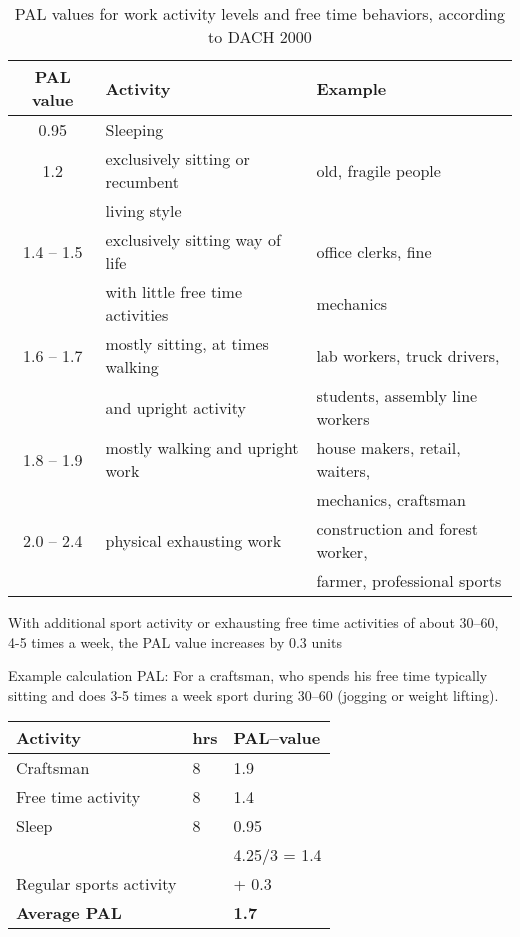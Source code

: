 \documentclass[../main.tex]{subfiles}
\begin{document}
\begin{table}[htb]
  \centering
  \begin{tabular}{cll}
    \textbf{PAL value} & \textbf{Activity} & \textbf{Example} \\
    \hline
    0.95 & Sleeping \\
    1.2 & exclusively sitting or recumbent & old, fragile people \\
    & living style \\
    1.4 -- 1.5 & exclusively sitting way of life & office clerks, fine \\
              & with little free time activities  & mechanics \\
    1.6 -- 1.7& mostly sitting, at times walking& lab workers, truck drivers, \\
              & and upright activity & students, assembly line workers\\
    1.8 -- 1.9 & mostly walking and upright work & house makers, retail, waiters,\\
              & & mechanics, craftsman\\
    2.0 -- 2.4 & physical exhausting work & construction and forest worker, \\
    & & farmer, professional sports\\
  \end{tabular}
  \vspace{1mm}
  
  \noindent With additional sport activity or exhausting free time activities of about \qtyrange{30}{60}{\min},
  4-5 times a week, the PAL value increases by 0.3 units
  \caption{PAL values for work activity levels and free time behaviors, according to DACH 2000}
\end{table}

Example calculation PAL:
For a craftsman, who spends his free time typically sitting and does 3-5 times a week sport during
\qtyrange{30}{60}{\min} (jogging or weight lifting).

  \begin{tabular}{lll}
    \textbf{Activity} & \textbf{hrs} & \textbf{PAL--value} \\
    \hline
    Craftsman & 8 & 1.9 \\
    Free time activity & 8 & 1.4 \\
    Sleep & 8 & 0.95 \\
    \hline
                      & & 4.25/3 = 1.4 \\
    Regular sports activity & & + 0.3 \\
    \hline
    \textbf{Average PAL} & & \textbf{1.7}\\
  \end{tabular}
  \vspace{1mm}
\end{document}
